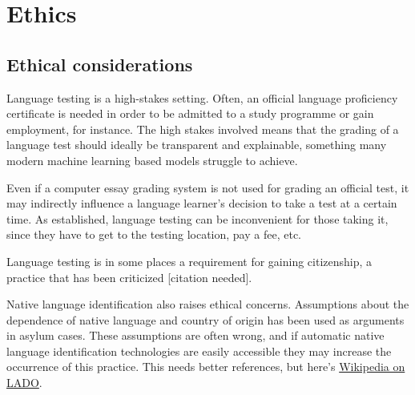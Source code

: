\chapter{Ethics}

\section{Ethical considerations}

Language testing is a high-stakes setting. Often, an official language
proficiency certificate is needed in order to be admitted to a study
programme or gain employment, for instance. The high stakes involved means
that the grading of a language test should ideally be transparent and
explainable, something many modern machine learning based models struggle to
achieve.

Even if a computer essay grading system is not used for grading an official
test, it may indirectly influence a language learner's decision to take a
test at a certain time. As established, language testing can be inconvenient
for those taking it, since they have to get to the testing location, pay a
fee, etc.

Language testing is in some places a requirement for gaining citizenship, a
practice that has been criticized [citation needed].

Native language identification also raises ethical concerns. Assumptions
about the dependence of native language and country of origin has been used
as arguments in asylum cases. These assumptions are often wrong, and if
automatic native language identification technologies are easily accessible
they may increase the occurrence of this practice. This needs better
references, but here's
\href{https://en.wikipedia.org/wiki/Language_analysis_for_the_determination_of_origin}{Wikipedia
on \ac{LADO}}.
